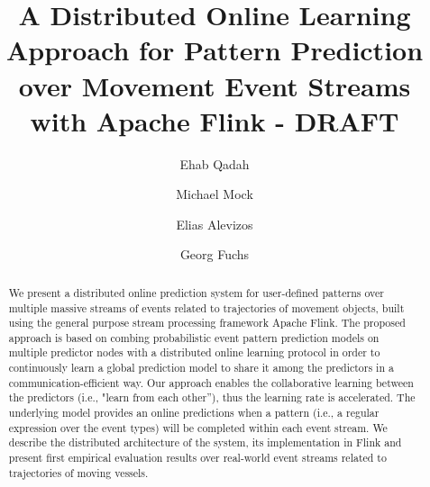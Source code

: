 \documentclass[sigconf,edbt]{acmart-edbt2018}
\begin{document}
\title{A Distributed Online Learning Approach for Pattern Prediction over Movement Event Streams with Apache Flink - DRAFT}

%
  
\author{Ehab Qadah}

\author{Michael Mock}


\author{Elias Alevizos}

\author{Georg Fuchs}

\renewcommand{\shortauthors}{}


\begin{abstract}
We present a distributed online prediction system for user-defined patterns over multiple massive streams of events related to trajectories of movement objects, built using the general purpose stream processing framework Apache Flink. The proposed approach is based on combing probabilistic event pattern prediction models on multiple predictor nodes with a distributed online learning protocol in order to continuously learn a global prediction model to share it among the predictors in a communication-efficient way. Our approach enables the  collaborative learning between the predictors (i.e., "learn from each other”), thus the learning rate is accelerated. The underlying model provides an online predictions when a pattern (i.e., a regular expression over the event types) will be completed within each event stream. We describe the distributed architecture of the system, its implementation in Flink and present first empirical evaluation results over real-world event streams related to trajectories of moving vessels.

\end{abstract}
\end{document}
